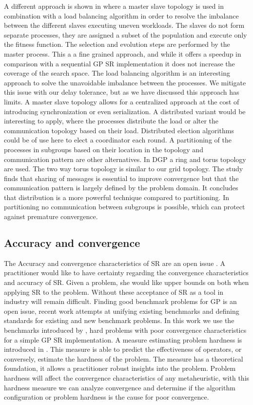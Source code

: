 A different approach is shown in \citep{DFGPSR} where a master slave topology is used in combination with a load balancing algorithm in order to resolve the imbalance between the different slaves executing uneven workloads. The slaves do not form separate processes, they are assigned a subset of the population and execute only the fitness function. The selection and evolution steps are performed by the master process. This a a fine grained approach, and while it offers a speedup in comparison with a sequential GP SR implementation it does not increase the coverage of the search space. The load balancing algorithm is an interesting approach to solve the unavoidable imbalance between the processes. We mitigate this issue with our delay tolerance, but as we have discussed this approach has limits. A master slave topology allows for a centralized approach at the cost of introducing synchronization or even serialization. A distributed variant would be interesting to apply, where the processes distribute the load or alter the communication topology based on their load. Distributed election algorithms could be of use here to elect a coordinator each round. A partitioning of the processes in subgroups based on their location in the topology and communication pattern are other alternatives.
In DGP \cite{DGP} a ring and torus topology are used. The two way torus topology is similar to our grid topology. The study finds that sharing of messages is essential to improve convergence but that the communication pattern is largely defined by the problem domain. It concludes that distribution is a more powerful technique compared to partitioning. In partitioning no communication between subgroups is possible, which can protect against premature convergence.

\subsection{Accuracy and convergence}
The Accuracy and convergence characteristics of SR are an open issue \citep{SRAccuracy, SRAccur, SRBaseline}. A practitioner would like to have certainty regarding the convergence characteristics and accuracy of SR. Given a problem, she would like upper bounds on both when applying SR to the problem. Without these acceptance of SR as a tool in industry will remain difficult.
Finding good benchmark problems for GP is an open issue, recent work \citep{GPBenchmarks} attempts at unifying existing benchmarks and defining standards for existing and new benchmark problems. In this work we use the benchmarks introduced by \cite{SRAccuracy}, hard problems with poor convergence characteristics for a simple GP SR implementation.
A measure estimating problem hardness is introduced in \citep{GPHardness}. This measure is able to predict the effectiveness of operators, or conversely, estimate the hardness of the problem. The measure has a theoretical foundation, it allows a practitioner robust insights into the problem. Problem hardness will affect the convergence characteristics of any metaheuristic, with this hardness measure we can analyze convergence and determine if the algorithm configuration or problem hardness is the cause for poor convergence.
